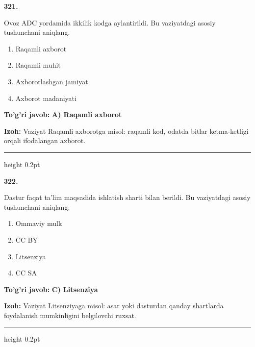 \documentclass[10pt,a4paper,oneside]{article}
\begin{document}
\noindent\textbf{\color{ink}321.}
\par
Ovoz ADC yordamida ikkilik kodga aylantirildi. Bu vaziyatdagi asosiy tushunchani aniqlang.
\begin{enumerate}[label=\Alph*),leftmargin=9mm]
\item Raqamli axborot
\item Raqamli muhit
\item Axborotlashgan jamiyat
\item Axborot madaniyati
\end{enumerate}
\begin{tcolorbox}[enhanced,breakable,colback=teal!4,colframe=teal!50!black,boxrule=0.5pt,arc=1.1mm,left=3mm,right=3mm,top=1.7mm,bottom=1.7mm,before skip=2mm,after skip=2mm]
\textbf{\color{teal}To'g'ri javob:} \textbf{A) Raqamli axborot}
\par\smallskip
\textbf{Izoh:} Vaziyat Raqamli axborotga misol: raqamli kod, odatda bitlar ketma-ketligi orqali ifodalangan axborot.
\end{tcolorbox}
\vspace{2mm}\hrule height 0.2pt \vspace{3mm}

\noindent\textbf{\color{ink}322.}
\par
Dastur faqat ta'lim maqsadida ishlatish sharti bilan berildi. Bu vaziyatdagi asosiy tushunchani aniqlang.
\begin{enumerate}[label=\Alph*),leftmargin=9mm]
\item Ommaviy mulk
\item CC BY
\item Litsenziya
\item CC SA
\end{enumerate}
\begin{tcolorbox}[enhanced,breakable,colback=teal!4,colframe=teal!50!black,boxrule=0.5pt,arc=1.1mm,left=3mm,right=3mm,top=1.7mm,bottom=1.7mm,before skip=2mm,after skip=2mm]
\textbf{\color{teal}To'g'ri javob:} \textbf{C) Litsenziya}
\par\smallskip
\textbf{Izoh:} Vaziyat Litsenziyaga misol: asar yoki dasturdan qanday shartlarda foydalanish mumkinligini belgilovchi ruxsat.
\end{tcolorbox}
\vspace{2mm}\hrule height 0.2pt \vspace{3mm}
\end{document}

